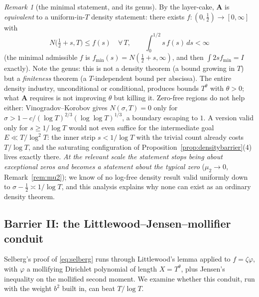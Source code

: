 \documentclass[11pt]{amsart}
\theoremstyle{plain}
\theoremstyle{definition}
\theoremstyle{remark}
\newtheorem{remark}[theorem]{Remark}
\newcommand{\Aax}{\mathbf{A}}
\begin{document}
\begin{remark}[the minimal statement, and its genus]\label{rem:gapA}
By the layer-cake, $\Aax$ is \emph{equivalent} to a uniform-in-$T$ density statement: there exists $f:(0,\tfrac12)\to[0,\infty]$ with
\[
N\bigl(\tfrac12+s,T\bigr)\le f(s)\quad\forall\,T,\qquad\int_0^{1/2}s\,f(s)\,ds<\infty
\]
(the minimal admissible $f$ is $f_{\min}(s)=N(\tfrac12+s,\infty)$, and then $\int 2sf_{\min}=I$ exactly). Note the genus: this is not a density theorem (a bound growing in $T$) but a \emph{finiteness} theorem (a $T$-independent bound per abscissa). The entire density industry, unconditional or conditional, produces bounds $T^{\theta}$ with $\theta>0$; what $\Aax$ requires is not improving $\theta$ but killing it. Zero-free regions do not help either: Vinogradov--Korobov gives $N(\sigma,T)=0$ only for $\sigma>1-c/(\log T)^{2/3}(\log\log T)^{1/3}$, a boundary escaping to $1$. A version valid only for $s\ge1/\log T$ would not even suffice for the intermediate goal $E\ll T/\log^2T$: the inner strip $s<1/\log T$ with the trivial count already costs $T/\log T$, and the saturating configuration of Proposition~\ref{prop:densitybarrier}(4) lives exactly there. \emph{At the relevant scale the statement stops being about exceptional zeros and becomes a statement about the typical zero} ($\mu_2\to0$, Remark~\ref{rem:mu2}); we know of no log-free density result valid uniformly down to $\sigma-\tfrac12\asymp1/\log T$, and this analysis explains why none can exist as an ordinary density theorem.
\end{remark}

\subsection{Barrier II: the Littlewood--Jensen--mollifier conduit}

Selberg's proof of \eqref{eq:selberg} runs through Littlewood's lemma applied to $f=\zeta\varphi$, with $\varphi$ a mollifying Dirichlet polynomial of length $X=T^\theta$, plus Jensen's inequality on the mollified second moment. We examine whether this conduit, run with the weight $b^2$ built in, can beat $T/\log T$.
\end{document}
